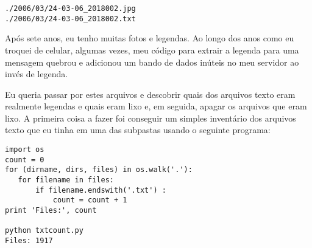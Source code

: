 \beforeverb
\begin{verbatim}
./2006/03/24-03-06_2018002.jpg
./2006/03/24-03-06_2018002.txt
\end{verbatim}
\afterverb

Após sete anos, eu tenho muitas fotos e legendas. Ao longo dos anos como eu troquei de celular, algumas vezes, meu código para extrair a legenda para uma mensagem quebrou e adicionou um bando de dados inúteis no meu servidor ao invés de legenda.

Eu queria passar por estes arquivos e descobrir quais dos arquivos texto eram realmente legendas e quais eram lixo e, em seguida, apagar os arquivos que eram lixo. A primeira coisa a fazer foi conseguir um simples inventário dos arquivos texto que eu tinha em uma das subpastas usando o seguinte programa:

\beforeverb
\begin{verbatim}
import os
count = 0
for (dirname, dirs, files) in os.walk('.'):
   for filename in files:
       if filename.endswith('.txt') :
           count = count + 1
print 'Files:', count

python txtcount.py
Files: 1917
\end{verbatim}
\afterverb
%

